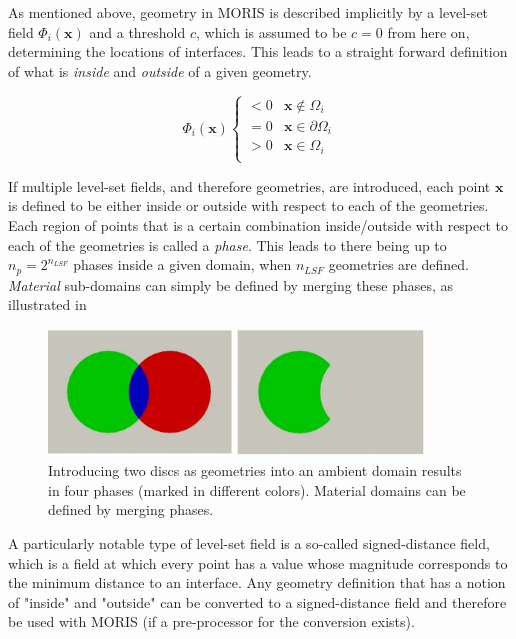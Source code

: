 As mentioned above, geometry in MORIS is described implicitly by a level-set field $\Phi_i(\bm{x})$ and a threshold $c$, which is assumed to be $c=0$ from here on, determining the locations of interfaces. 
This leads to a straight forward definition of what is \emph{inside} and \emph{outside} of a given geometry. 

\begin{equation}
\label{eq:level_set_field}
    \Phi_i(\bm{x}) 
    \begin{cases}
        < 0 & \bm{x} \notin \Omega_i \\
        = 0 & \bm{x} \in \partial\Omega_i \\
        > 0 & \bm{x} \in \Omega_i \\
    \end{cases}
\end{equation}

\hypertarget{phase_assignment}{}
If multiple level-set fields, and therefore geometries, are introduced, each point $\bm{x}$ is defined to be either inside or outside with respect to each of the geometries. Each region of points that is a certain combination inside/outside with respect to each of the geometries is called a \emph{phase}. This leads to there being up to $n_p = 2^{n_{LSF}}$ phases inside a given domain, when $n_{LSF}$ geometries are defined. \emph{Material} sub-domains can simply be defined by merging these phases, as illustrated in 

\begin{figure}[h]
    \begin{center}
    \includegraphics[width=10cm]{Figures/phase_merging.png}
    \caption{Introducing two discs as geometries into an ambient domain results in four phases (marked in different colors). Material domains can be defined by merging phases. } 
    \label{fig:phase_mergin}
    \end{center}
\end{figure}

A particularly notable type of level-set field is a so-called signed-distance field, which is a field at which every point has a value whose magnitude corresponds to the minimum distance to an interface.
Any geometry definition that has a notion of "inside" and "outside" can be converted to a signed-distance field and therefore be used with MORIS (if a pre-processor for the conversion exists).

